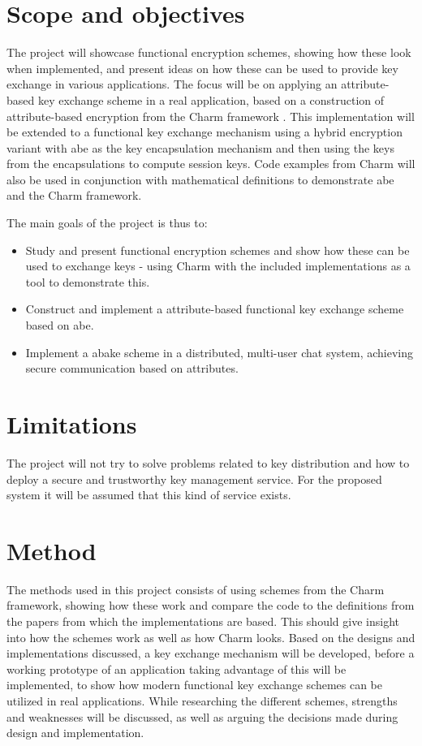 \section{Scope and objectives}\label{sec:scope}

The project will showcase functional encryption schemes, showing how these look when implemented, and present ideas on how these can be used to provide key exchange in various applications. The focus will be on applying an attribute-based key exchange scheme in a real application, based on a construction of attribute-based encryption from the Charm framework \cite{DBLP:Charm13}. This implementation will be extended to a functional key exchange mechanism using a hybrid encryption variant with \gls{abe} as the key encapsulation mechanism and then using the keys from the encapsulations to compute session keys. Code examples from Charm will also be used in conjunction with mathematical definitions to demonstrate \gls{abe} and the Charm framework. 
\par The main goals of the project is thus to:
\begin{itemize}
\item Study and present functional encryption schemes and show how these can be used to exchange keys - using Charm with the included implementations as a tool to demonstrate this.
\item Construct and implement a attribute-based functional key exchange scheme based on \gls{abe}.
\item Implement a \gls{abake} scheme in a distributed, multi-user chat system, achieving secure communication based on attributes.
\end{itemize}

\section{Limitations}\label{sec:limitations}
The project will not try to solve problems related to key distribution and how to deploy a secure and trustworthy key management service. For the proposed system it will be assumed that this kind of service exists.

\section{Method}
The methods used in this project consists of using schemes from the Charm framework, showing how these work and compare the code to the definitions from the papers from which the implementations are based. This should give insight into how the schemes work as well as how Charm looks. Based on the designs and implementations discussed, a key exchange mechanism will be developed, before a working prototype of an application taking advantage of this will be implemented, to show how modern functional key exchange schemes can be utilized in real applications. While researching the different schemes, strengths and weaknesses will be discussed, as well as arguing the decisions made during design and implementation.



